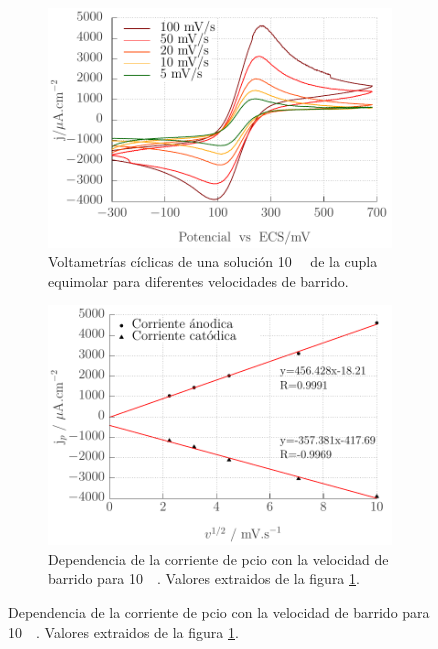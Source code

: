 {\begin{figure}[ht]
 	     	\begin{subfigure}[t]{0.495\textwidth}
         		\includegraphics[width=\textwidth]{Graficos/Velocidades_Fe.pdf}
        	    \caption{Voltametrías cíclicas de una solución \SI{10}{\milli\Molar} de la cupla equimolar \fe\space para diferentes velocidades de barrido.}
        	    \label{fig:Fe_c}
     		 	\end{subfigure}
     	 	\begin{subfigure}[t]{0.495\textwidth}
        		\includegraphics[width=\textwidth]{Graficos/VelocidadesCal_Fe.pdf}
       			\caption[Respuesta a diferentes velocidades de barrido para \fe]{Dependencia de la corriente de pcio con la velocidad de barrido para \fe\space \SI{10}{\milli\Molar}. Valores extraidos de la figura \ref{fig:Fe_c}.}
         		\label{fig:Fe_d}
     			\end{subfigure}

\end{figure}}
